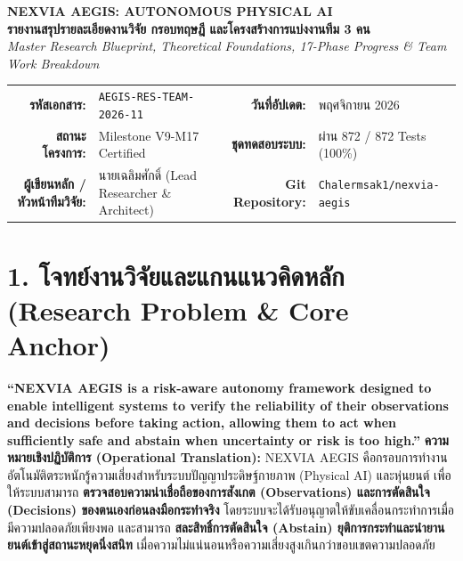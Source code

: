 \documentclass[10pt,a4paper]{article}
\begin{document}
\enlargethispage{2\baselineskip}

\begin{center}
  {\LARGE \textbf{\textcolor{primary}{NEXVIA AEGIS: AUTONOMOUS PHYSICAL AI}}}\\[3pt]
  {\large \textbf{\textcolor{secondary}{รายงานสรุปรายละเอียดงานวิจัย กรอบทฤษฎี และโครงสร้างการแบ่งงานทีม 3 คน}}}\\[2pt]
  {\small \textit{Master Research Blueprint, Theoretical Foundations, 17-Phase Progress \& Team Work Breakdown}}
  \vspace{4pt}

  \footnotesize
  \begin{tabular}{rlrl}
    \textbf{รหัสเอกสาร:} & \texttt{AEGIS-RES-TEAM-2026-11} & \textbf{วันที่อัปเดต:} & พฤศจิกายน 2026 \\
    \textbf{สถานะโครงการ:} & Milestone V9-M17 Certified & \textbf{ชุดทดสอบระบบ:} & ผ่าน 872 / 872 Tests (100\%) \\
    \textbf{ผู้เขียนหลัก / หัวหน้าทีมวิจัย:} & นายเฉลิมศักดิ์ (Lead Researcher \& Architect) & \textbf{Git Repository:} & \texttt{Chalermsak1/nexvia-aegis} \\
  \end{tabular}
\end{center}

\vspace{1pt}
\section*{\textcolor{secondary}{\large 1. โจทย์งานวิจัยและแกนแนวคิดหลัก (Research Problem \& Core Anchor)}}
\vspace{-4pt}

\begin{anchorbox}
  {\small \textbf{``NEXVIA AEGIS is a risk-aware autonomy framework designed to enable intelligent systems to verify the reliability of their observations and decisions before taking action, allowing them to act when sufficiently safe and abstain when uncertainty or risk is too high.''}}
  \vspace{2pt}
  \tcblower
  \footnotesize
  \textbf{ความหมายเชิงปฏิบัติการ (Operational Translation):}
  NEXVIA AEGIS คือกรอบการทำงานอัตโนมัติตระหนักรู้ความเสี่ยงสำหรับระบบปัญญาประดิษฐ์กายภาพ (Physical AI) และหุ่นยนต์ เพื่อให้ระบบสามารถ \textbf{ตรวจสอบความน่าเชื่อถือของการสังเกต (Observations) และการตัดสินใจ (Decisions) ของตนเองก่อนลงมือกระทำจริง} โดยระบบจะได้รับอนุญาตให้ขับเคลื่อนกระทำการเมื่อมีความปลอดภัยเพียงพอ และสามารถ \textbf{สละสิทธิ์การตัดสินใจ (Abstain) ยุติการกระทำและนำยานยนต์เข้าสู่สถานะหยุดนิ่งสนิท} เมื่อความไม่แน่นอนหรือความเสี่ยงสูงเกินกว่าขอบเขตความปลอดภัย
\end{anchorbox}
\end{document}
